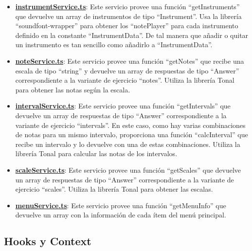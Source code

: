\documentclass[12pt,twoside,titlepage]{report}
\begin{document}
\begin{itemize}
    \item \href{https://github.com/alberttogoca/EarFit/blob/main/src/services/instrumentService.ts}{\textbf{instrumentService.ts}}: Este servicio provee una función ``getInstruments'' que devuelve un array de instrumentos de tipo ``Instrument\text{[]}''. Usa la librería ``soundfont-wrapper'' para obtener los ``notePlayer'' para cada instrumento definido en la constante ``InstrumentData''. De tal manera que añadir o quitar un instrumento es tan sencillo como añadirlo a ``InstrumentData''.
    \item \href{https://github.com/alberttogoca/EarFit/blob/main/src/services/noteService.ts}{\textbf{noteService.ts}}: Este servicio provee una función ``getNotes'' que recibe una escala de tipo ``string'' y devuelve un array de respuestas de tipo ``Answer\text{[]}'' correspondiente a la variante de ejercicio ``notes''. Utiliza la librería Tonal para obtener las notas según la escala.
    \item \href{https://github.com/alberttogoca/EarFit/blob/main/src/services/intervalService.ts}{\textbf{intervalService.ts}}: Este servicio provee una función ``getIntervals'' que devuelve un array de respuestas de tipo ``Answer\text{[]}'' correspondiente a la  variante de ejercicio ``intervals''. En este caso, como hay varias combinaciones de notas para un mismo intervalo, proporciona una función ``calcInterval'' que recibe un intervalo y lo devuelve con una de estas combinaciones. Utiliza la librería Tonal para calcular las notas de los intervalos.
    \item \href{https://github.com/alberttogoca/EarFit/blob/main/src/services/scaleService.ts}{\textbf{scaleService.ts}}: Este servicio provee una función ``getScales'' que devuelve un array de respuestas de tipo ``Answer\text{[]}'' correspondiente a la  variante de ejercicio ``scales''. Utiliza la librería Tonal para obtener las escalas.
    \item \href{https://github.com/alberttogoca/EarFit/blob/main/src/services/menuService.ts}{\textbf{menuService.ts}}: Este servicio provee una función ``getMenuInfo'' que devuelve un array con la información de cada ítem del menú principal. 
\end{itemize}

\subsection{Hooks y Context}
\label{sec:Hooks}
\end{document}
